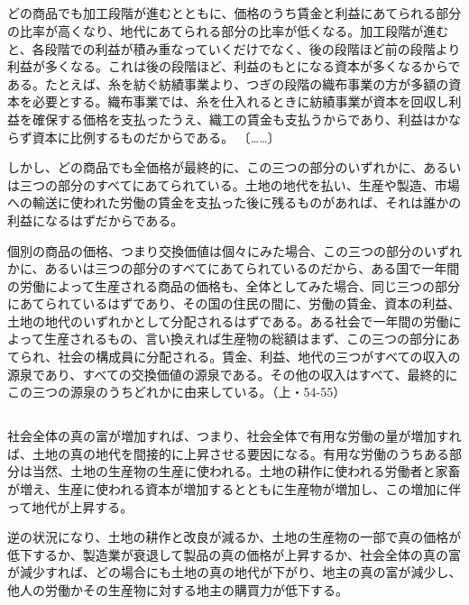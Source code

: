 \subsection{}



どの商品でも加工段階が進むとともに、価格のうち賃金と利益にあてられる部分の比率が高くなり、地代にあてられる部分の比率が低くなる。加工段階が進むと、各段階での利益が積み重なっていくだけでなく、後の段階ほど前の段階より利益が多くなる。これは後の段階ほど、利益のもとになる資本が多くなるからである。たとえば、糸を紡ぐ紡績事業より、つぎの段階の織布事業の方が多額の資本を必要とする。織布事業では、糸を仕入れるときに紡績事業が資本を回収し利益を確保する価格を支払ったうえ、織工の賃金も支払うからであり、利益はかならず資本に比例するものだからである。
〔……〕

しかし、どの商品でも全価格が最終的に、この三つの部分のいずれかに、あるいは三つの部分のすべてにあてられている。土地の地代を払い、生産や製造、市場への輸送に使われた労働の賃金を支払った後に残るものがあれば、それは誰かの利益になるはずだからである。

個別の商品の価格、つまり交換価値は個々にみた場合、この三つの部分のいずれかに、あるいは三つの部分のすべてにあてられているのだから、ある国で一年間の労働によって生産される商品の価格も、全体としてみた場合、同じ三つの部分にあてられているはずであり、その国の住民の間に、労働の賃金、資本の利益、土地の地代のいずれかとして分配されるはずである。ある社会で一年間の労働によって生産されるもの、言い換えれば生産物の総額はまず、この三つの部分にあてられ、社会の構成員に分配される。賃金、利益、地代の三つがすべての収入の源泉であり、すべての交換価値の源泉である。その他の収入はすべて、最終的にこの三つの源泉のうちどれかに由来している。（上・54-55）

\subsection{}



社会全体の真の富が増加すれば、つまり、社会全体で有用な労働の量が増加すれば、土地の真の地代を間接的に上昇させる要因になる。有用な労働のうちある部分は当然、土地の生産物の生産に使われる。土地の耕作に使われる労働者と家畜が増え、生産に使われる資本が増加するとともに生産物が増加し、この増加に伴って地代が上昇する。

逆の状況になり、土地の耕作と改良が減るか、土地の生産物の一部で真の価格が低下するか、製造業が衰退して製品の真の価格が上昇するか、社会全体の真の富が減少すれば、どの場合にも土地の真の地代が下がり、地主の真の富が減少し、他人の労働かその生産物に対する地主の購買力が低下する。

